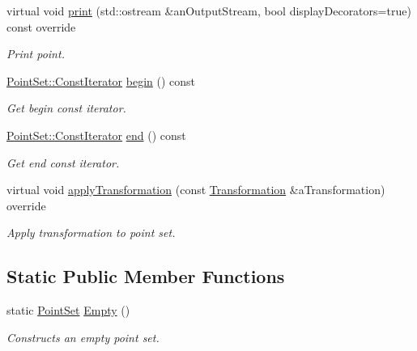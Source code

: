 \begin{DoxyCompactItemize}
virtual void \hyperlink{classlibrary_1_1math_1_1geom_1_1d2_1_1objects_1_1_point_set_a652098938854c19294b5df8e8634cc9a}{print} (std\+::ostream \&an\+Output\+Stream, bool display\+Decorators=true) const override
\begin{DoxyCompactList}\small\item\em Print point. \end{DoxyCompactList}\item 
\hyperlink{classlibrary_1_1math_1_1geom_1_1d2_1_1objects_1_1_point_set_ad4c4f52fdc966f0d2031402edefc9e98}{Point\+Set\+::\+Const\+Iterator} \hyperlink{classlibrary_1_1math_1_1geom_1_1d2_1_1objects_1_1_point_set_ae7e4ce8100cde825aa0d3c5cc092eef9}{begin} () const
\begin{DoxyCompactList}\small\item\em Get begin const iterator. \end{DoxyCompactList}\item 
\hyperlink{classlibrary_1_1math_1_1geom_1_1d2_1_1objects_1_1_point_set_ad4c4f52fdc966f0d2031402edefc9e98}{Point\+Set\+::\+Const\+Iterator} \hyperlink{classlibrary_1_1math_1_1geom_1_1d2_1_1objects_1_1_point_set_a7ae46d64848d5dda85ea621bb0f24ef7}{end} () const
\begin{DoxyCompactList}\small\item\em Get end const iterator. \end{DoxyCompactList}\item 
virtual void \hyperlink{classlibrary_1_1math_1_1geom_1_1d2_1_1objects_1_1_point_set_acfb8652fd1f17f101e7750a0b81452c0}{apply\+Transformation} (const \hyperlink{classlibrary_1_1math_1_1geom_1_1d2_1_1_transformation}{Transformation} \&a\+Transformation) override
\begin{DoxyCompactList}\small\item\em Apply transformation to point set. \end{DoxyCompactList}\end{DoxyCompactItemize}
\subsection*{Static Public Member Functions}
\begin{DoxyCompactItemize}
\item 
static \hyperlink{classlibrary_1_1math_1_1geom_1_1d2_1_1objects_1_1_point_set}{Point\+Set} \hyperlink{classlibrary_1_1math_1_1geom_1_1d2_1_1objects_1_1_point_set_af09fa6d8bce9f64b150c739e1ed7bfc6}{Empty} ()
\begin{DoxyCompactList}\small\item\em Constructs an empty point set. \end{DoxyCompactList}\end{DoxyCompactItemize}


